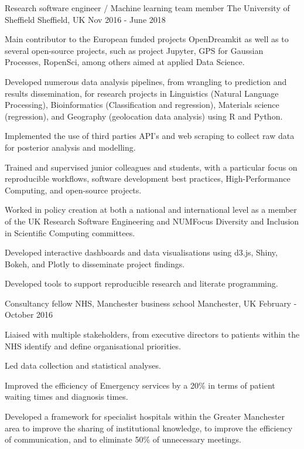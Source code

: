 \begin{cventries}
\cventry
{Research software engineer  / Machine learning team member } %
{The University of Sheffield } %
{Sheffield, UK} %
{Nov 2016 - June 2018 } %
{ %
\begin{cvitems}
\item {Main contributor to the European funded projects OpenDreamkit as well as to several open-source projects, such as project Jupyter, GPS for Gaussian Processes, RopenSci, among others aimed at applied Data Science.}
\item {Developed numerous data analysis pipelines, from wrangling to prediction and results dissemination, for research projects in Linguistics (Natural Language Processing), Bioinformatics (Classification and regression), Materials science (regression), and Geography (geolocation data analysis) using R and Python.}
\item { Implemented the use of third parties API's and web scraping to collect raw data for posterior analysis and modelling.}
\item {Trained and supervised junior colleagues and students, with a particular focus on reproducible workflows, software development best practices, High-Performance Computing, and open-source projects.}
\item {Worked in policy creation at both a national and international level as a member of the UK Research Software Engineering and NUMFocus Diversity and Inclusion in Scientific Computing committees.}
\item {Developed interactive dashboards and data visualisations using d3.js, Shiny, Bokeh, and Plotly to disseminate project findings.}
\item{Developed tools to support reproducible research and literate programming.}
\end{cvitems}
}



\cventry
{Consultancy fellow}
{NHS, Manchester business school}
{Manchester, UK}
{February - October 2016}
{
\begin{cvitems}
\item {Liaised with multiple stakeholders, from executive directors to patients within the NHS identify and define organisational priorities.}
\item  {Led data collection and statistical analyses.}
\item  {Improved the efficiency of Emergency services by a 20\% in terms of patient waiting times and diagnosis times.}
\item{Developed a framework for specialist hospitals within the Greater Manchester area to improve the sharing of institutional knowledge, to improve the efficiency of communication, and to eliminate 50\% of unnecessary meetings.}
\end{cvitems}
}



\end{cventries}
